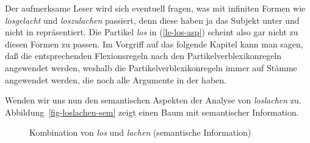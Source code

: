 Der aufmerksame Leser wird sich eventuell fragen, was mit infiniten Formen wie
\emph{losgelacht} und \emph{loszulachen} passiert, denn diese haben ja das Subjekt unter
\subj und nicht in \subcat repräsentiert. Die Partikel \emph{los} in (\ref{le-los-asp})
scheint also gar nicht zu diesen Formen zu passen. Im Vorgriff auf das folgende Kapitel
kann man sagen, daß die entsprechenden Flexionsregeln nach den Partikelverblexikonregeln angewendet werden, weshalb
die Partikelverblexikonregeln immer auf Stämme angewendet werden, die noch alle Argumente
in der \subcatl haben.

Wenden wir uns nun den semantischen Aspekten der Analyse von \emph{loslachen} zu.
Abbildung~\vref{fig-loslachen-sem} zeigt einen Baum mit semantischer Information.
\begin{figure}[htbp]
\begin{center}
\end{center}
\caption{Kombination von {\em los} und {\em lachen} (semantische Information)}\label{fig-loslachen-sem}
\end{figure}
